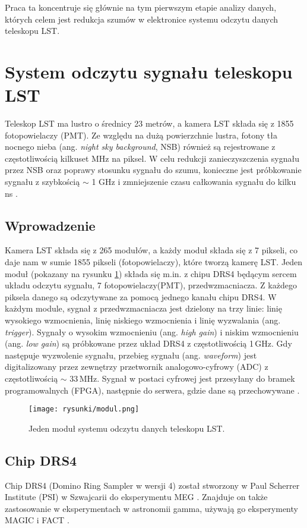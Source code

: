 \documentclass[a4paper,11pt,twoside]{article}
\begin{document}
Praca ta koncentruje się głównie na tym pierwszym etapie analizy danych, których celem jest redukcja szumów w elektronice systemu odczytu danych teleskopu LST. 

\newpage
\section{System odczytu sygnału teleskopu LST}
Teleskop LST  ma lustro o średnicy 23 metrów, a kamera LST składa się z 1855 fotopowielaczy (PMT). Ze względu na dużą powierzchnie lustra, fotony tła nocnego nieba (ang. \textsl{night sky background}, NSB) również są rejestrowane z częstotliwością kilkuset MHz na piksel. W celu redukcji zanieczyszczenia sygnału przez NSB oraz poprawy stosunku sygnału do szumu, konieczne jest próbkowanie  sygnału z szybkością $\sim$ 1 GHz i zmniejszenie czasu całkowania sygnału do kilku ns \cite{dragon_lst}.
\subsection{Wprowadzenie}
Kamera LST składa się z 265 modułów, a każdy moduł składa się z 7 pikseli, co daje nam w sumie 1855 pikseli (fotopowielaczy), które tworzą kamerę LST. Jeden moduł (pokazany na rysunku \ref{fig:drs4}) składa się m.in. z chipu DRS4 będącym sercem układu odczytu sygnału, 7 fotopowielaczy(PMT), przedwzmacniacza.
Z każdego piksela danego są odczytywane za pomocą jednego kanału chipu DRS4. W każdym module, sygnał z przedwzmacniacza jest dzielony na trzy linie: linię wysokiego wzmocnienia, linię niskiego wzmocnienia i linię wyzwalania (ang. \textsl{trigger}). Sygnały o wysokim wzmocnieniu (ang. \textsl{high gain}) i niskim wzmocnieniu (ang. \textsl{low gain}) są próbkowane przez układ DRS4 z częstotliwością 1\,GHz. Gdy następuje wyzwolenie sygnału, przebieg sygnału (ang. \textsl{waveform}) jest digitalizowany przez zewnętrzy przetwornik analogowo-cyfrowy (ADC) z częstotliwością $\sim$ 33\,MHz. Sygnał w postaci cyfrowej jest przesyłany do bramek programowalnych (FPGA), następnie do serwera, gdzie dane są przechowywane \cite{dragon_lst}. 
\begin{figure}[H] 
\centering
\texttt{[image: rysunki/modul.png]}
\caption{Jeden moduł systemu odczytu danych teleskopu LST.}
\label{fig:drs4}
\end{figure}
\subsection{Chip DRS4}
Chip DRS4 (Domino Ring Sampler w wersji 4) został stworzony w Paul Scherrer Institute (PSI) w Szwajcarii do eksperymentu MEG \cite{meg_experiment}.
Znajduje on także zastosowanie w eksperymentach w astronomii gamma, używają go eksperymenty MAGIC i FACT \cite{drs4_magic}.
\end{document}
